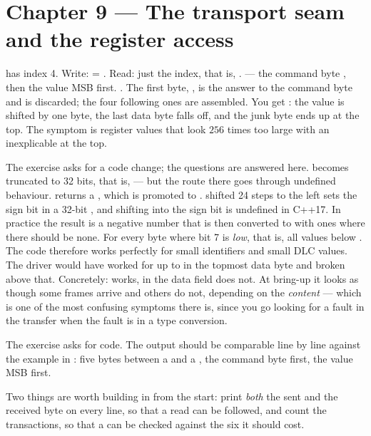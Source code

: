 \section*{Chapter 9 --- The transport seam and the register access}

  has index 4. Write:  = . Read: just the
index, that is, .
  --- the command byte , then the value MSB first.
 . The first byte, , is the answer to the command byte and is
discarded; the four following ones are assembled.
 You get : the value is shifted by one byte, the last data byte falls off,
and the junk byte ends up at the top. The symptom is register values that look $256$ times too
large with an inexplicable  at the top.

The exercise asks for a code change; the questions are answered here.
  becomes  truncated to 32 bits, that is,
 --- but the route there goes through undefined behaviour. 
returns a , which is promoted to .  shifted 24 steps to
the left sets the sign bit in a 32-bit , and shifting into the sign bit is undefined in
C++17. In practice the result is a negative number that is then converted to 
with ones where there should be none.
 For every byte where bit 7 is \emph{low}, that is, all values below . The code
therefore works perfectly for small identifiers and small DLC values.
 The driver would have worked for  up to  in the topmost data byte and
broken above that. Concretely:  works,  in the data field does not. At
bring-up it looks as though some frames arrive and others do not, depending on the \emph{content}
--- which is one of the most confusing symptoms there is, since you go looking for a fault in the
transfer when the fault is in a type conversion.

The exercise asks for code. The output should be comparable line by line against the example in
: five bytes between a  and a , the command byte first,
the value MSB first.

Two things are worth building in from the start: print \emph{both} the sent and the received byte
on every line, so that a read can be followed, and count the transactions, so that a 
can be checked against the six it should cost.


